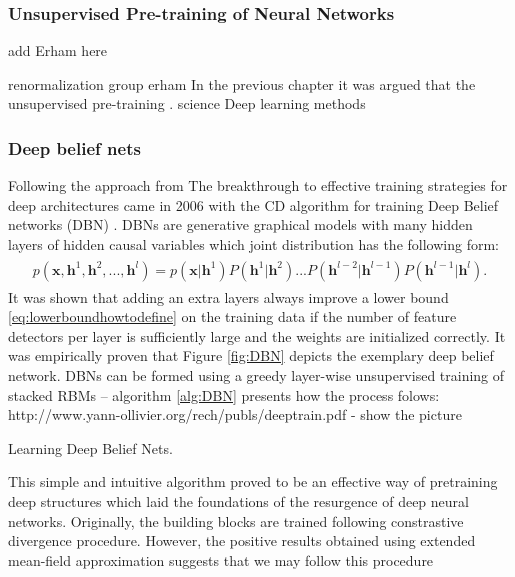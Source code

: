 \documentclass[../report/report.tex]{subfiles}
\begin{document}
\subsubsection{Unsupervised Pre-training of Neural Networks}
add Erham here

renormalization group
erham
In the previous chapter it was argued that the unsupervised pre-training . 
science
Deep learning methods

\subsubsection{Deep belief nets}
Following the approach from 
The breakthrough to effective training strategies for deep architectures came in 2006 with the CD algorithm for training
Deep Belief networks (DBN) \cite{hinton2006reducing}. DBNs are generative graphical models with many hidden layers of hidden
causal variables which joint distribution has the following form:
\begin{align}
\begin{split}
p(\mathbf{x}, \mathbf{h}^1, \mathbf{h}^2,..., \mathbf{h}^l) = p(\mathbf{x}| \mathbf{h}^1)P(\mathbf{h}^1|\mathbf{h}^2)...
P(\mathbf{h}^{l-2}|\mathbf{h}^{l-1})P(\mathbf{h}^{l-1}|\mathbf{h}^{l}).
\end{split}
\end{align}
It was shown that adding an extra layers always improve a lower bound \ref{eq:lowerboundhowtodefine} on the training data
if the number of feature detectors per layer is sufficiently large and the weights are initialized correctly. It was empirically
proven that Figure \ref{fig:DBN} depicts the exemplary deep belief network.
DBNs can be formed using a greedy layer-wise unsupervised training of stacked RBMs -- algorithm \ref{alg:DBN} presents how the process
folows:
http://www.yann-ollivier.org/rech/publs/deeptrain.pdf - show the picture 
\begin{algorithm}[!bthp]
\caption{Learning Deep Belief Nets.}
\label{alg:DBN}
\begin{algorithmic}
\EndFor
\end{algorithmic}
\end{algorithm}
This simple and intuitive algorithm proved to be an effective way of pretraining deep structures which laid the foundations
of the resurgence of deep neural networks. Originally, the building blocks are trained following constrastive divergence 
procedure.  However, the positive results obtained using extended mean-field approximation 
suggests that we may 
follow this procedure 
\end{document}
